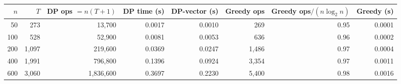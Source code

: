 \begin{tabular}{@{}r r r r r r r r@{}}
\toprule
$n$ & $T$ & DP ops $=n(T+1)$ & DP time (s) & DP-vector (s) & Greedy ops & Greedy ops$/(n\log_2 n)$ & Greedy (s)\\
\midrule
50 & 273 & 13,700 & 0.0017 & 0.0010 & 269 & 0.95 & 0.0001\\
100 & 528 & 52,900 & 0.0081 & 0.0053 & 636 & 0.96 & 0.0002\\
200 & 1,097 & 219,600 & 0.0369 & 0.0247 & 1,486 & 0.97 & 0.0004\\
400 & 1,991 & 796,800 & 0.1396 & 0.0924 & 3,354 & 0.97 & 0.0011\\
600 & 3,060 & 1,836,600 & 0.3697 & 0.2230 & 5,400 & 0.98 & 0.0016\\
\bottomrule
\end{tabular}
